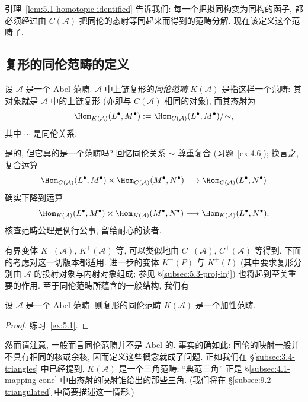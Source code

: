 引理~\ref{lem:5.1-homotopic-identified} 告诉我们: 每一个把拟同构变为同构的函子, 都必须经过由 $C(\mathcal{A})$ 把同伦的态射等同起来而得到的范畴分解. 现在该定义这个范畴了.

\subsection{复形的同伦范畴的定义}
\label{subsec:5.2-homotopic-category}

\begin{definition}\label{def:5.2-homotopic-category}
设 $\mathcal{A}$ 是一个 Abel 范畴. $\mathcal{A}$ 中上链复形的\emph{同伦范畴} $K(\mathcal{A})$ 是指这样一个范畴: 其对象就是 $\mathcal{A}$ 中的上链复形 (亦即与 $C(\mathcal{A})$ 相同的对象), 而其态射为
\[
\Hom_{K(\mathcal{A})}(L^\bullet,M^\bullet):=\Hom_{C(\mathcal{A})}(L^\bullet,M^\bullet)/\!\sim,
\]
其中 $\sim$ 是同伦关系.
\end{definition}

\indent 是的, 但它真的是一个范畴吗? 回忆同伦关系 $\sim$ 尊重复合 (习题~\ref{ex:4.6}); 换言之, 复合运算
\[
\Hom_{C(\mathcal{A})}(L^\bullet,M^\bullet)\times\Hom_{C(\mathcal{A})}(M^\bullet,N^\bullet)\longrightarrow\Hom_{C(\mathcal{A})}(L^\bullet,N^\bullet)
\]
确实下降到运算
\[
\Hom_{K(\mathcal{A})}(L^\bullet,M^\bullet)\times\Hom_{K(\mathcal{A})}(M^\bullet,N^\bullet)\longrightarrow\Hom_{K(\mathcal{A})}(L^\bullet,N^\bullet).
\]
核查范畴公理是例行公事, 留给耐心的读者.

有界变体 $K^-(\mathcal{A})$, $K^+(\mathcal{A})$ 等, 可以类似地由 $C^-(\mathcal{A})$, $C^+(\mathcal{A})$ 等得到. 下面的考虑对这一切版本都适用. 进一步的变体 $K^-(P)$ 与 $K^+(I)$ (其中要求复形分别由 $\mathcal{A}$ 的投射对象与内射对象组成; 参见 §\ref{subsec:5.3-proj-inj}) 也将起到至关重要的作用.
至于同伦范畴所蕴含的一般结构, 我们有

\begin{lemma}\label{lem:5.3-K-additive}
设 $\mathcal{A}$ 是一个 Abel 范畴. 则复形的同伦范畴 $K(\mathcal{A})$ 是一个加性范畴.
\end{lemma}

\begin{proof}
练习~\ref{ex:5.1}.
\end{proof}

\indent 然而请注意, 一般而言同伦范畴并不是 Abel 的. 事实的确如此: 同伦的映射一般并不具有相同的核或余核, 因而定义这些概念就成了问题. 正如我们在 \S\ref{subsec:3.4-triangles} 中已经提到, $K(\mathcal{A})$ 是一个三角范畴; ``典范三角'' 正是 \S\ref{subsec:4.1-mapping-cone} 中由态射的映射锥给出的那些三角. (我们将在 \S\ref{subsec:9.2-triangulated} 中简要描述这一情形.)


